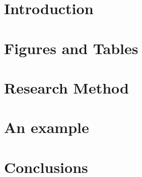 \documentclass{format/MUSTThesisC}
\begin{document}
\chapter{Introduction}

\chapter{Figures and Tables}

\chapter{Research Method}

\chapter{An example}

\chapter{Conclusions}






\bibreference


\MUSTappendix{
	
}


\MUSTacknowledgement{
	
}





\def\mustProfilea{
	2014.09
}


\def\mustProfileb{
	2010.09--2014.06 \\
	2014.09--2017.06
}


\def\mustProfilec{
	X~X~X~大學 \\
	X~X~X~大學
}


\def\mustProfiled{
	X~X~學士學位\\
	X~X~碩士學位
}


\def\mustProfilee{
\smallskip
	待寫,待補
}


\def\mustProfilef{
\smallskip
	待寫,待補
}




\MUSTProfile
\end{document}
